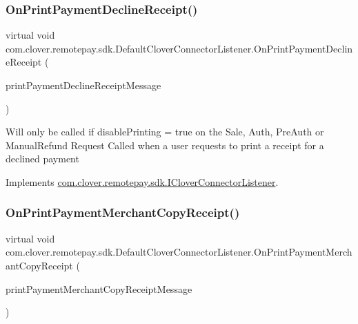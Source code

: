 \subsubsection{\texorpdfstring{On\+Print\+Payment\+Decline\+Receipt()}{OnPrintPaymentDeclineReceipt()}}
{\footnotesize\ttfamily virtual void com.\+clover.\+remotepay.\+sdk.\+Default\+Clover\+Connector\+Listener.\+On\+Print\+Payment\+Decline\+Receipt (\begin{DoxyParamCaption}\item[{\hyperlink{classcom_1_1clover_1_1remotepay_1_1sdk_1_1_print_payment_decline_receipt_message}{Print\+Payment\+Decline\+Receipt\+Message}}]{print\+Payment\+Decline\+Receipt\+Message }\end{DoxyParamCaption})\hspace{0.3cm}{\ttfamily [virtual]}}



Will only be called if disable\+Printing = true on the Sale, Auth, Pre\+Auth or Manual\+Refund Request Called when a user requests to print a receipt for a declined payment 



Implements \hyperlink{interfacecom_1_1clover_1_1remotepay_1_1sdk_1_1_i_clover_connector_listener_a3f1e0e6bd2b019c4e1ecbbb39078d0a7}{com.\+clover.\+remotepay.\+sdk.\+I\+Clover\+Connector\+Listener}.

\mbox{\label{classcom_1_1clover_1_1remotepay_1_1sdk_1_1_default_clover_connector_listener_a308bf50f9fbf9bb6ec0955adde11a429}} 
\subsubsection{\texorpdfstring{On\+Print\+Payment\+Merchant\+Copy\+Receipt()}{OnPrintPaymentMerchantCopyReceipt()}}
{\footnotesize\ttfamily virtual void com.\+clover.\+remotepay.\+sdk.\+Default\+Clover\+Connector\+Listener.\+On\+Print\+Payment\+Merchant\+Copy\+Receipt (\begin{DoxyParamCaption}\item[{\hyperlink{classcom_1_1clover_1_1remotepay_1_1sdk_1_1_print_payment_merchant_copy_receipt_message}{Print\+Payment\+Merchant\+Copy\+Receipt\+Message}}]{print\+Payment\+Merchant\+Copy\+Receipt\+Message }\end{DoxyParamCaption})\hspace{0.3cm}{\ttfamily [virtual]}}



